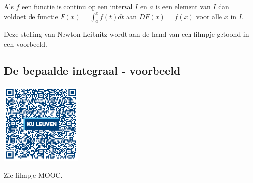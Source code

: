 \begin{eigenschap}
	Als $f$ een functie is continu op een interval $I$ en $a$ is een element van $I$ dan voldoet de functie $F(x) = \int^x_a f(t)dt$ aan $DF(x)=f(x)$ voor alle $x$ in $I$.
\end{eigenschap}

Deze stelling van Newton-Leibnitz wordt aan de hand van een filmpje getoond in een voorbeeld.

%
%
%
%
%
%


\subsection{De bepaalde integraal - voorbeeld}
\begin{minipage}{.25\linewidth}
	\raggedright
	\includegraphics[width=4cm]{6_afgeleiden_integralen/inputs/QR_Code_BEPINTVB_module6_2new}
\end{minipage}
\begin{minipage}{.7\linewidth}
	Zie filmpje MOOC.
\end{minipage}


